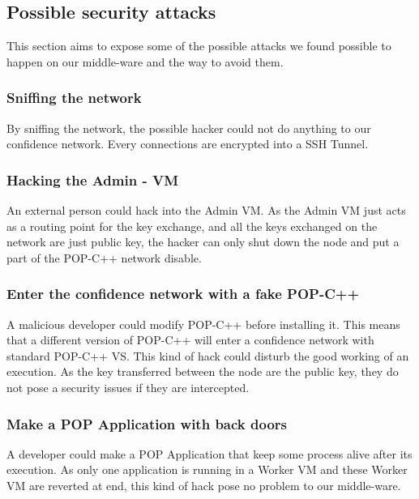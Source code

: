 \subsection{Possible security attacks}
This section aims to expose some of the possible attacks we found possible to happen on our middle-ware and the way to avoid them. 

\subsubsection{Sniffing the network}
By sniffing the network, the possible hacker could not do anything to our confidence network. Every connections are encrypted into a SSH Tunnel. 

\subsubsection{Hacking the Admin - VM}
An external person could hack into the Admin VM. As the Admin VM just acts as a routing point for the key exchange, and all the keys exchanged on the network are just public key, the hacker can only shut down the node and put a part of the POP-C++ network disable. 

\subsubsection{Enter the confidence network with a fake POP-C++}
A malicious developer could modify POP-C++ before installing it. This means that a different version of POP-C++ will enter a confidence network with standard POP-C++ VS. This kind of hack could disturb the good working of an execution. As the key transferred between the node are the public key, they do not pose a security issues if they are intercepted. 

\subsubsection{Make a POP Application with back doors}
A developer could make a POP Application that keep some process alive after its execution. As only one application is running in a Worker VM and these Worker VM are reverted at end, this kind of hack pose no problem to our middle-ware.

